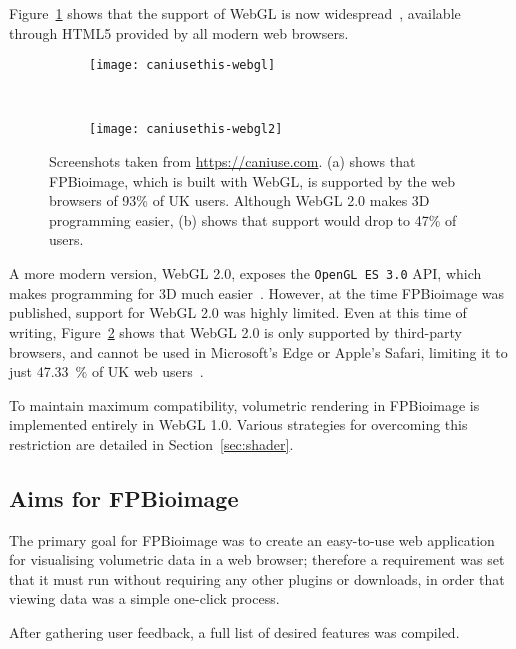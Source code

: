 Figure~\ref{fig:caniusethis-webgl} shows that the support of WebGL is now widespread~\cite{caniuse}, available through HTML5 provided by all modern web browsers.

\begin{figure}[b!]
\centering
\begin{subfigure}[b]{1.0\textwidth}
\texttt{[image: caniusethis-webgl]}
\caption{} \label{fig:caniusethis-webgl}
\end{subfigure}

~\newline
\begin{subfigure}[b]{1.0\textwidth}
\texttt{[image: caniusethis-webgl2]}
\caption{} \label{fig:caniusethis-webgl2}
\end{subfigure}
\caption[FPBioimage: WebGL is supported by 93\% of users browsing the web]{Screenshots taken from \url{https://caniuse.com}\cite{caniuse}. (a) shows that FPBioimage, which is built with WebGL, is supported by the web browsers of 93\% of UK users. Although WebGL 2.0 makes 3D programming easier, (b) shows that support would drop to 47\% of users.  }
\label{fig:caniusethis}
\end{figure}

A more modern version, WebGL 2.0, exposes the \texttt{OpenGL ES 3.0} API, which makes programming for 3D much easier~\cite{webgl2}.
However, at the time FPBioimage was published, support for WebGL 2.0 was highly limited. 
Even at this time of writing, Figure~\ref{fig:caniusethis-webgl2} shows that WebGL 2.0 is only supported by third-party browsers, and cannot be used in Microsoft's Edge or Apple's Safari, limiting it to just \SI{47.33}{\percent} of UK web users~\cite{caniuse}.

To maintain maximum compatibility, volumetric rendering in FPBioimage is implemented entirely in WebGL 1.0.
Various strategies for overcoming this restriction are detailed in Section~\ref{sec:shader}.

\subsection{Aims for FPBioimage} 
The primary goal for FPBioimage was to create an easy-to-use web application for visualising volumetric data in a web browser; therefore a requirement was set that it must run without requiring any other plugins or downloads, in order that viewing data was a simple one-click process. 

After gathering user feedback, a full list of desired features was compiled. 

